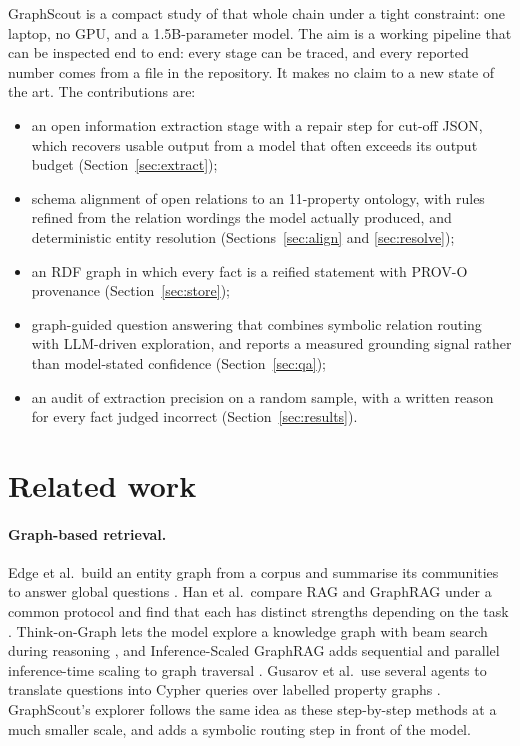 \documentclass[11pt]{article}
\begin{document}
GraphScout is a compact study of that whole chain under a tight constraint: one laptop, no GPU, and a 1.5B-parameter model. The aim is a working pipeline that can be inspected end to end: every stage can be traced, and every reported number comes from a file in the repository. It makes no claim to a new state of the art. The contributions are:
\begin{itemize}
  \item an open information extraction stage with a repair step for cut-off JSON, which recovers usable output from a model that often exceeds its output budget (Section~\ref{sec:extract});
  \item schema alignment of open relations to an 11-property ontology, with rules refined from the relation wordings the model actually produced, and deterministic entity resolution (Sections~\ref{sec:align} and \ref{sec:resolve});
  \item an RDF graph in which every fact is a reified statement with PROV-O provenance (Section~\ref{sec:store});
  \item graph-guided question answering that combines symbolic relation routing with LLM-driven exploration, and reports a measured grounding signal rather than model-stated confidence (Section~\ref{sec:qa});
  \item an audit of extraction precision on a random sample, with a written reason for every fact judged incorrect (Section~\ref{sec:results}).
\end{itemize}

\section{Related work}

\paragraph{Graph-based retrieval.} Edge et al.\ build an entity graph from a corpus and summarise its communities to answer global questions \cite{edge2024graphrag}. Han et al.\ compare RAG and GraphRAG under a common protocol and find that each has distinct strengths depending on the task \cite{han2025ragvsgraphrag}. Think-on-Graph lets the model explore a knowledge graph with beam search during reasoning \cite{sun2024tog}, and Inference-Scaled GraphRAG adds sequential and parallel inference-time scaling to graph traversal \cite{thompson2025isgraphrag}. Gusarov et al.\ use several agents to translate questions into Cypher queries over labelled property graphs \cite{gusarov2025multiagent}. GraphScout's explorer follows the same idea as these step-by-step methods at a much smaller scale, and adds a symbolic routing step in front of the model.
\end{document}
